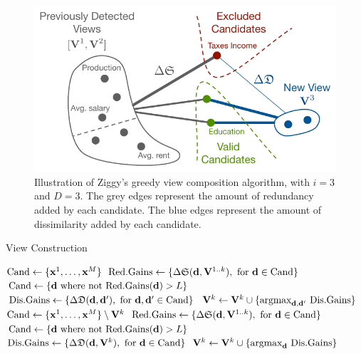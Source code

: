 \begin{figure}
  \centering
  \includegraphics[width=0.8\columnwidth]{Figures/Greedy}
  \caption{Illustration of Ziggy's greedy view composition algorithm, with
  $i=3$ and $D=3$. The grey edges represent the
  amount of redundancy added by each candidate. The blue edges represent the
  amount of dissimilarity added by each candidate.}
  \label{pic:greedy}
\end{figure}
\begin{algorithm}[t!]
\caption{View Construction}
\label{algo:view_search}
\begin{algorithmic}
        \State $\text{Cand} \gets \{\mathbf{x}^1, \ldots, \mathbf{x}^M\}$
        \State $\text{Red.Gains} \gets 
            \{\Delta\mathfrak{S}(\mathbf{d}, \mathbf{V}^{1..k}), \text{~for~} \mathbf{d} \in \text{Cand}\}$
         \State $\text{Cand} \gets 
            \{\mathbf{d} \text{~where~not~Red.Gains}(\mathbf{d}) > L \}$
        \State $\text{Dis.Gains} \gets 
        \{\Delta\mathfrak{D}(\mathbf{d}, \mathbf{d}'), \text{~for~} \mathbf{d},\mathbf{d}' \in \text{Cand}\}$
        \State $\mathbf{V}^k \gets \mathbf{V}^k \cup \{\text{argmax}_{\bf{d}, \bf{d}'}\ \text{Dis.Gains}\}$
            \State $\text{Cand} \gets \{\mathbf{x}^1, \ldots, \mathbf{x}^M\}
                \setminus \mathbf{V}^k$
            \State $\text{Red.Gains} \gets 
                \{\Delta\mathfrak{S}(\mathbf{d}, \mathbf{V}^{1..k}), \text{~for~} \mathbf{d} \in \text{Cand}\}$
             \State $\text{Cand} \gets 
                \{\mathbf{d} \text{~where~not~Red.Gains}(\mathbf{d}) > L \}$
            \State $\text{Dis.Gains} \gets 
                \{\Delta\mathfrak{D}(\mathbf{d}, \mathbf{V}^{k}), \text{~for~} \mathbf{d} \in \text{Cand}\}$
            \State $\mathbf{V}^k \gets \mathbf{V}^k \cup \{\text{argmax}_{\bf{d}}\ \text{Dis.Gains}\}$
        \EndFor
    \EndFor
    \EndFunction
\end{algorithmic}
\end{algorithm}


